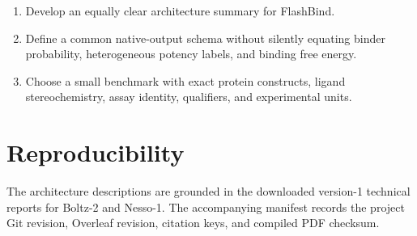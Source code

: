 \documentclass[11pt]{article}
\begin{document}
\begin{enumerate}
  \item Develop an equally clear architecture summary for FlashBind.
  \item Define a common native-output schema without silently equating binder
        probability, heterogeneous potency labels, and binding free energy.
  \item Choose a small benchmark with exact protein constructs, ligand
        stereochemistry, assay identity, qualifiers, and experimental units.
\end{enumerate}

\section*{Reproducibility}

The architecture descriptions are grounded in the downloaded version-1
technical reports for Boltz-2 and Nesso-1. The accompanying manifest records
the project Git revision, Overleaf revision, citation keys, and compiled PDF
checksum.



\end{document}
